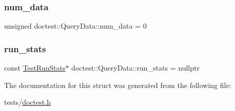 \subsubsection{\texorpdfstring{num\+\_\+data}{num\_data}}
{\footnotesize\ttfamily unsigned doctest\+::\+Query\+Data\+::num\+\_\+data = 0}

\mbox{\label{structdoctest_1_1QueryData_a435f443f389323f47cb8b0e4202bbea9}} 
\subsubsection{\texorpdfstring{run\+\_\+stats}{run\_stats}}
{\footnotesize\ttfamily const \hyperlink{structdoctest_1_1TestRunStats}{Test\+Run\+Stats}$\ast$ doctest\+::\+Query\+Data\+::run\+\_\+stats = nullptr}



The documentation for this struct was generated from the following file\+:\begin{DoxyCompactItemize}
\item 
tests/\hyperlink{doctest_8h}{doctest.\+h}\end{DoxyCompactItemize}
